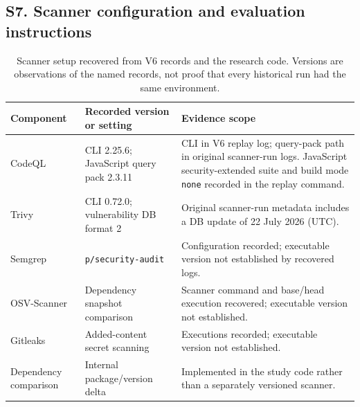 \subsection*{S7. Scanner configuration and evaluation instructions}\label{sec:s7}
\begin{table}[H]
\caption{Scanner setup recovered from V6 records and the research code. Versions are observations of the named records, not proof that every historical run had the same environment.}
\label{tab:scanner-env}
\footnotesize\renewcommand{\arraystretch}{1.13}
\begin{tabularx}{\linewidth}{@{}L{2cm}L{3.0cm}Y@{}}
\toprule
\textbf{Component} & \textbf{Recorded version or setting} & \textbf{Evidence scope}\\
\midrule
CodeQL & CLI 2.25.6; JavaScript query pack 2.3.11 & CLI in V6 replay log; query-pack path in original scanner-run logs. JavaScript security-extended suite and build mode \texttt{none} recorded in the replay command.\\
Trivy & CLI 0.72.0; vulnerability DB format 2 & Original scanner-run metadata includes a DB update of 22 July 2026 (UTC).\\
Semgrep & \texttt{p/security-audit} & Configuration recorded; executable version not established by recovered logs.\\
OSV-Scanner & Dependency snapshot comparison & Scanner command and base/head execution recovered; executable version not established.\\
Gitleaks & Added-content secret scanning & Executions recorded; executable version not established.\\
Dependency comparison & Internal package/version delta & Implemented in the study code rather than a separately versioned scanner.\\
\bottomrule
\end{tabularx}
\end{table}

